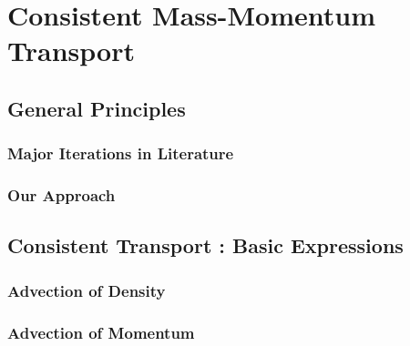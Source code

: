 \setchapterpreamble[u]{\margintoc}
\chapter{Consistent Mass-Momentum Transport}




\section{General Principles}



\subsection*{Major Iterations in Literature}


\subsection*{Our Approach}





\section{Consistent Transport : Basic Expressions}


\subsection*{Advection of Density}


\subsection*{Advection of Momentum}

